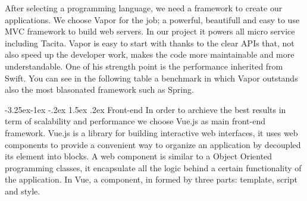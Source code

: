 \documentclass[]{usiinfbachelorproject}
\makeatletter
\newcommand\subsubsection{\@startsection{subsubsection}{3}{\z@}%
                {-3.25ex\@plus -1ex \@minus -.2ex}%
                {1.5ex \@plus .2ex}%
                {\normalfont\normalsize\bfseries}}
\makeatother
\begin{document}
After selecting a programming language, we need a framework to create our applications. We choose Vapor for the job; a powerful, beautifull and easy to use MVC framework to build web servers. In our project it powers all micro service including Tacita.
Vapor is easy to start with thanks to the clear APIs that, not also speed up the developer work, makes the code more maintainable and more understandable. One of his strength point is the performance inherited from Swift. You can see in the following table a benchmark in which Vapor outstands also the most blasonated framework such as Spring.
\begin{figure}[H]
  \centering
\end{figure} 
\subsubsection{Front-end}
In order to archieve the best results in term of scalability and performance we choose Vue.js as main front-end framework. Vue.js is a library for building interactive web interfaces, it uses web components to provide a convenient way to organize an application by decoupled its element into blocks.
A web component is similar to a Object Oriented programming classes, it encapsulate all the logic behind a certain functionality of the application. In Vue, a component, in formed by three parts: template, script and style.
\end{document}
